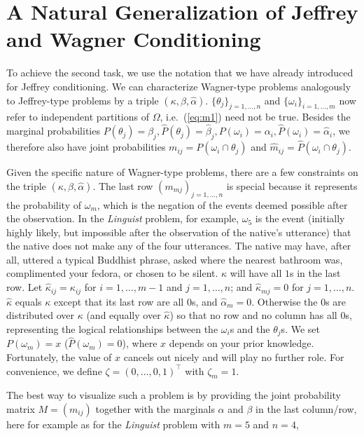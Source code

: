 \documentclass[11pt]{article}
\begin{document}
\section{A Natural Generalization of Jeffrey and Wagner Conditioning}
\label{Generalization}

To achieve the second task, we use the notation that we have already
introduced for Jeffrey conditioning. We can characterize Wagner-type
problems analogously to Jeffrey-type problems by a triple
$(\kappa,\beta,\hat{\alpha})$.
$\{\theta_{j}\}_{j=1,\ldots,n}$ and $\{\omega_{i}\}_{i=1,\ldots,m}$
now refer to independent partitions of $\Omega$, i.e.\ (\ref{eq:m1})
need not be true. Besides the marginal probabilities
$P(\theta_{j})=\beta_{j}, \hat{P}(\theta_{j})=\hat{\beta}_{j},
P(\omega_{i})=\alpha_{i},\hat{P}(\omega_{i})=\hat{\alpha}_{i}$, we
therefore also have joint probabilities
$m_{ij}=P(\omega_{i}\cap\theta_{j})$ and
$\hat{m}_{ij}=\hat{P}(\omega_{i}\cap\theta_{j})$.

Given the specific nature of Wagner-type problems, there are a few
constraints on the triple $(\kappa,\beta,\hat{\alpha})$. The last row
$(m_{mj})_{j=1,\ldots,n}$ is special because it represents the
probability of $\omega_{m}$, which is the negation of the events
deemed possible after the observation. In the \emph{Linguist} problem,
for example, $\omega_{5}$ is the event (initially highly likely, but
impossible after the observation of the native's utterance) that the
native does not make any of the four utterances. The native may have,
after all, uttered a typical Buddhist phrase, asked where the nearest
bathroom was, complimented your fedora, or chosen to be silent.
$\kappa$ will have all $1$s in the last row. Let
$\hat{\kappa}_{ij}=\kappa_{ij}$ for $i=1,\ldots,m-1$ and
$j=1,\ldots,n$; and $\hat{\kappa}_{mj}=0$ for $j=1,\ldots,n$.
$\hat{\kappa}$ equals $\kappa$ except that its last row are all $0$s,
and $\hat{\alpha}_{m}=0$. Otherwise the $0$s are distributed over
$\kappa$ (and equally over $\hat{\kappa}$) so that no row and no
column has all $0$s, representing the logical relationships between
the $\omega_{i}$s and the $\theta_{j}$s. We set $P(\omega_{m})=x$
($\hat{P}(\omega_{m})=0$), where $x$ depends on your prior knowledge.
Fortunately, the value of $x$ cancels out nicely and will play no
further role. For convenience, we define
$\zeta=(0,\ldots,0,1)^{\intercal}$ with $\zeta_{m}=1$.

The best way to visualize such a problem is by providing the joint
probability matrix $M=(m_{ij})$ together with the marginals $\alpha$
and $\beta$ in the last column/row, here for example as for the
\emph{Linguist} problem with $m=5$ and $n=4$,
\end{document}
